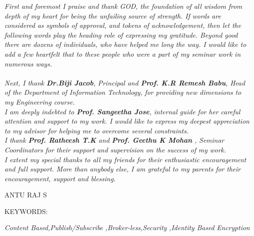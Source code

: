 \documentclass[MTech]{iitmdiss}
\begin{document}
\acknowledgements
\textit{First and foremost I praise and thank GOD, the foundation of all wisdom from depth of my heart for being the unfailing source of strength. If words are considered as symbols of approval, and tokens of acknowledgement, then let the following words play the heading role of expressing my gratitude. Beyond good there are dozens of individuals, who have helped me long the way. I would like to add a few heartfelt that to these people who were a part of my seminar work in numerous ways.
\\ \\Next, I thank \textbf{Dr.Biji Jacob}, Principal and \textbf{Prof. K.R Remesh Babu}, Head of the Department of Information Technology, for providing new dimensions to my Engineering course.\\ \newline
I am deeply indebted to \textbf{Prof. Sangeetha Jose}, internal guide for her careful attention and support to my work. I would like to express my deepest appreciation to my advisor for helping me to overcome several constraints.\\ \newline
I thank \textbf{Prof. Ratheesh T.K} and \textbf{Prof. Geethu K Mohan} , Seminar Coordinators for their support and supervision on the success of my work.\\ \newline
I extent my special thanks to all my friends for their enthusiastic encouragement and full support. More than anybody else, I am grateful to my parents for their encouragement, support and blessing.}
\vspace*{24pt}

\begin{flushright}ANTU RAJ S\end{flushright}
                              



\abstract

\noindent KEYWORDS: \hspace*{0.5em} \parbox[t]{4.4in}{\textit{Content Based,Publish/Subscribe ,Broker-less,Security ,Identity Based Encryption}}

\vspace*{24pt}
\end{document}
